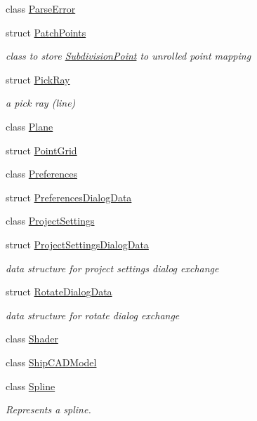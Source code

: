 \begin{DoxyCompactItemize}
\item 
class \hyperlink{classShipCAD_1_1ParseError}{Parse\+Error}
\item 
struct \hyperlink{structShipCAD_1_1PatchPoints}{Patch\+Points}
\begin{DoxyCompactList}\small\item\em class to store \hyperlink{classShipCAD_1_1SubdivisionPoint}{Subdivision\+Point} to unrolled point mapping \end{DoxyCompactList}\item 
struct \hyperlink{structShipCAD_1_1PickRay}{Pick\+Ray}
\begin{DoxyCompactList}\small\item\em a pick ray (line) \end{DoxyCompactList}\item 
class \hyperlink{classShipCAD_1_1Plane}{Plane}
\item 
struct \hyperlink{structShipCAD_1_1PointGrid}{Point\+Grid}
\item 
class \hyperlink{classShipCAD_1_1Preferences}{Preferences}
\item 
struct \hyperlink{structShipCAD_1_1PreferencesDialogData}{Preferences\+Dialog\+Data}
\item 
class \hyperlink{classShipCAD_1_1ProjectSettings}{Project\+Settings}
\item 
struct \hyperlink{structShipCAD_1_1ProjectSettingsDialogData}{Project\+Settings\+Dialog\+Data}
\begin{DoxyCompactList}\small\item\em data structure for project settings dialog exchange \end{DoxyCompactList}\item 
struct \hyperlink{structShipCAD_1_1RotateDialogData}{Rotate\+Dialog\+Data}
\begin{DoxyCompactList}\small\item\em data structure for rotate dialog exchange \end{DoxyCompactList}\item 
class \hyperlink{classShipCAD_1_1Shader}{Shader}
\item 
class \hyperlink{classShipCAD_1_1ShipCADModel}{Ship\+C\+A\+D\+Model}
\item 
class \hyperlink{classShipCAD_1_1Spline}{Spline}
\begin{DoxyCompactList}\small\item\em Represents a spline. \end{DoxyCompactList}\item 

\end{DoxyCompactItemize}
